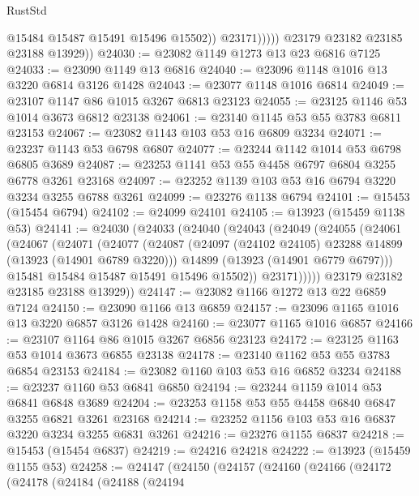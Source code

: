 \begin{lexlean}{RustStd}
\begin{coremodule}
                      @15484
                      @15487
                      @15491
                      @15496
                      @15502))
                  @23171)))))
        @23179
        @23182
        @23185
        @23188
        @13929))
@24030 := @23082 @1149 @1273 @13 @23 @6816 @7125
@24033 := @23090 @1149 @13 @6816
@24040 := @23096 @1148 @1016 @13 @3220 @6814 @3126 @1428
@24043 := @23077 @1148 @1016 @6814
@24049 := @23107 @1147 @86 @1015 @3267 @6813 @23123
@24055 := @23125 @1146 @53 @1014 @3673 @6812 @23138
@24061 := @23140 @1145 @53 @55 @3783 @6811 @23153
@24067 := @23082 @1143 @103 @53 @16 @6809 @3234
@24071 := @23237 @1143 @53 @6798 @6807
@24077 := @23244 @1142 @1014 @53 @6798 @6805 @3689
@24087 := @23253 @1141 @53 @55 @4458 @6797 @6804 @3255 @6778 @3261 @23168
@24097 := @23252 @1139 @103 @53 @16 @6794 @3220 @3234 @3255 @6788 @3261
@24099 := @23276 @1138 @6794
@24101 := @15453 (@15454 @6794)
@24102 := @24099 @24101
@24105 := @13923 (@15459 @1138 @53)
@24141 := @24030
    (@24033
      (@24040
        (@24043
          (@24049
            (@24055
              (@24061
                (@24067
                  (@24071
                    (@24077
                      (@24087
                        (@24097 (@24102 @24105) @23288 @14899 (@13923 (@14901 @6789 @3220)))
                        @14899
                        (@13923 (@14901 @6779 @6797)))
                      @15481
                      @15484
                      @15487
                      @15491
                      @15496
                      @15502))
                  @23171)))))
        @23179
        @23182
        @23185
        @23188
        @13929))
@24147 := @23082 @1166 @1272 @13 @22 @6859 @7124
@24150 := @23090 @1166 @13 @6859
@24157 := @23096 @1165 @1016 @13 @3220 @6857 @3126 @1428
@24160 := @23077 @1165 @1016 @6857
@24166 := @23107 @1164 @86 @1015 @3267 @6856 @23123
@24172 := @23125 @1163 @53 @1014 @3673 @6855 @23138
@24178 := @23140 @1162 @53 @55 @3783 @6854 @23153
@24184 := @23082 @1160 @103 @53 @16 @6852 @3234
@24188 := @23237 @1160 @53 @6841 @6850
@24194 := @23244 @1159 @1014 @53 @6841 @6848 @3689
@24204 := @23253 @1158 @53 @55 @4458 @6840 @6847 @3255 @6821 @3261 @23168
@24214 := @23252 @1156 @103 @53 @16 @6837 @3220 @3234 @3255 @6831 @3261
@24216 := @23276 @1155 @6837
@24218 := @15453 (@15454 @6837)
@24219 := @24216 @24218
@24222 := @13923 (@15459 @1155 @53)
@24258 := @24147
    (@24150
      (@24157
        (@24160
          (@24166
            (@24172
              (@24178
                (@24184
                  (@24188
                    (@24194

\end{coremodule}
\end{lexlean}
